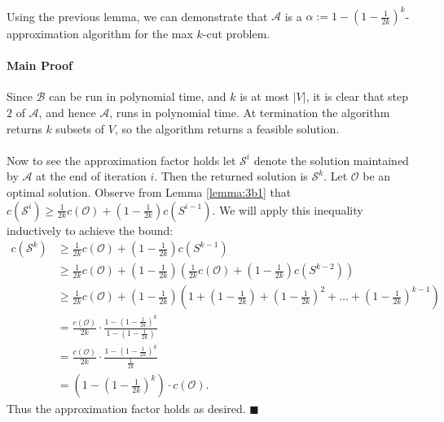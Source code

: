 \documentclass[letterpaper,12pt,oneside,onecolumn]{article}
\newcommand{\cA}{\mathcal{A}} \newcommand{\cB}{\mathcal{B}}
\newcommand{\cO}{\mathcal{O}} \newcommand{\cP}{\mathcal{P}}
\newcommand{\cS}{\mathcal{S}} \newcommand{\cT}{\mathcal{T}}
\begin{document}
\paragraph{}
Using the previous lemma, we can demonstrate that $\cA$ is a $\alpha := 1-(1-\frac{1}{2k})^k$-approximation algorithm for the max $k$-cut problem.
\paragraph{Main Proof}
Since $\cB$ can be run in polynomial time, and $k$ is at most $|V|$, it is clear that step $2$ of $\cA$, and hence $\cA$, runs in polynomial time. At termination the algorithm returns $k$ subsets of $V$, so the algorithm returns a feasible solution.
\paragraph{} 
Now to see the approximation factor holds let $\cS^i$ denote the solution maintained by $\cA$ at the end of iteration $i$. Then the returned solution is $\cS^{k}$. Let $\cO$ be an optimal solution. Observe from Lemma \ref{lemma:3b1} that $c(\cS^{i}) \geq \frac{1}{2k} c(\cO) + (1- \frac{1}{2k})c(S^{i-1})$. We will apply this inequality inductively to achieve the bound:
\begin{align*}
c(\cS^{k}) &\geq \frac{1}{2k} c(\cO) + (1- \frac{1}{2k})c(S^{k-1}) \\
		&\geq \frac{1}{2k} c(\cO) + (1- \frac{1}{2k})(\frac{1}{2k} c(\cO) + (1- \frac{1}{2k})c(S^{k-2})) \\
		&\geq \frac{1}{2k} c(\cO) + (1- \frac{1}{2k})(1 + (1-\frac{1}{2k}) + (1-\frac{1}{2k})^2 + \dots + (1-\frac{1}{2k})^{k-1}) \\
		&= \frac{c(\cO)}{2k} \cdot \frac{1-(1-\frac{1}{2k})^k}{1-(1-\frac{1}{2k})} \\
		&=\frac{c(\cO)}{2k} \cdot \frac{1-(1-\frac{1}{2k})^k}{\frac{1}{2k}}\\
		&= (1-(1-\frac{1}{2k})^k)\cdot c(\cO).
\end{align*}
Thus the approximation factor holds as desired. $\blacksquare$
\section{}
\end{document}
